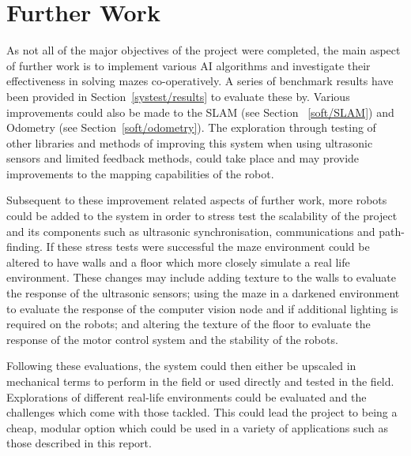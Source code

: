 
\chapter{Further Work}\label{furtherwork}
As not all of the major objectives of the project were completed, the main 
aspect of further work is to implement various AI algorithms and investigate 
their effectiveness in solving mazes co-operatively. A series of benchmark 
results have been provided in Section~\ref{systest/results} to evaluate 
these by. Various improvements could also be made to the SLAM (see Section~
\ref{soft/SLAM}) and Odometry (see Section~\ref{soft/odometry}). The exploration through testing of other 
libraries and methods of improving this system when using ultrasonic sensors 
and limited feedback methods, could take place and may provide improvements 
to the mapping capabilities of the robot. 

Subsequent to these improvement related aspects of further work, more robots 
could be added to the system in order to stress test the scalability of the 
project and its components such as ultrasonic synchronisation, 
communications and path-finding. If these stress tests were successful the 
maze environment could be altered to have walls and a floor which more 
closely simulate a real life environment. These changes may include adding 
texture to the walls to evaluate the response of the ultrasonic sensors; 
using the maze in a darkened environment to evaluate the response of the 
computer vision node and if additional lighting is required on the robots; 
and altering the texture of the floor to evaluate the response of the motor 
control system and the stability of the robots. 

Following these evaluations, the system could then either be upscaled in 
mechanical terms to perform in the field or used directly and tested in the 
field. Explorations of different real-life environments could be evaluated 
and the challenges which come with those tackled. This could lead the 
project to being a cheap, modular option which could be used in a variety of 
applications such as those described in this report. 